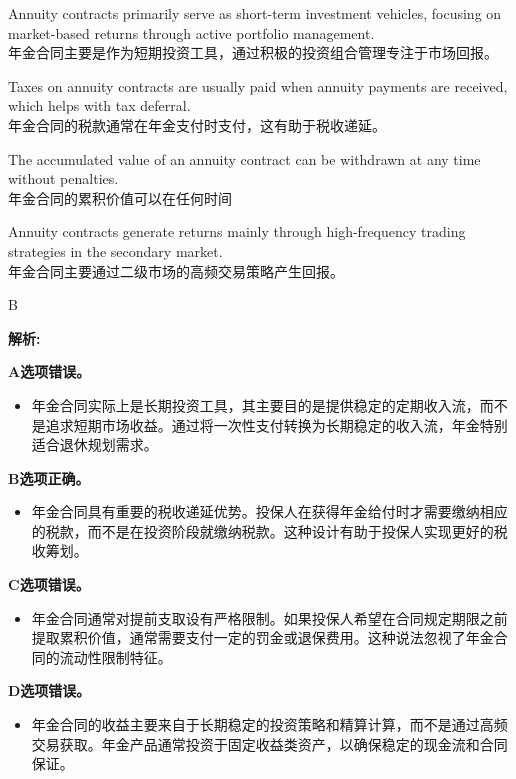 \documentclass{article}
\newenvironment{explanation}
{\textbf{解析:}\par}
{\par}
\begin{document}
\begin{choices}
    \item Annuity contracts primarily serve as short-term investment vehicles, focusing on market-based returns through active portfolio management.\\
    年金合同主要是作为短期投资工具，通过积极的投资组合管理专注于市场回报。
    \item Taxes on annuity contracts are usually paid when annuity payments are received, which helps with tax deferral.\\
    年金合同的税款通常在年金支付时支付，这有助于税收递延。
    \item The accumulated value of an annuity contract can be withdrawn at any time without penalties.\\
    年金合同的累积价值可以在任何时间 
    \item Annuity contracts generate returns mainly through high-frequency trading strategies in the secondary market.\\
    年金合同主要通过二级市场的高频交易策略产生回报。
\end{choices}

\begin{correctanswer}
    B
\end{correctanswer}

\begin{explanation}
    \textbf{A选项错误。}
    \begin{itemize}
        \item 年金合同实际上是长期投资工具，其主要目的是提供稳定的定期收入流，而不是追求短期市场收益。通过将一次性支付转换为长期稳定的收入流，年金特别适合退休规划需求。
    \end{itemize}

    \textbf{B选项正确。}
    \begin{itemize}
        \item 年金合同具有重要的税收递延优势。投保人在获得年金给付时才需要缴纳相应的税款，而不是在投资阶段就缴纳税款。这种设计有助于投保人实现更好的税收筹划。
    \end{itemize}

    \textbf{C选项错误。}
    \begin{itemize}
        \item 年金合同通常对提前支取设有严格限制。如果投保人希望在合同规定期限之前提取累积价值，通常需要支付一定的罚金或退保费用。这种说法忽视了年金合同的流动性限制特征。
    \end{itemize}

    \textbf{D选项错误。}
    \begin{itemize}
        \item 年金合同的收益主要来自于长期稳定的投资策略和精算计算，而不是通过高频交易获取。年金产品通常投资于固定收益类资产，以确保稳定的现金流和合同保证。
    \end{itemize}
\end{explanation}
\end{document}
